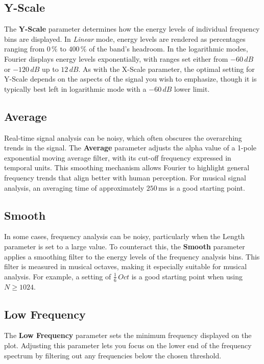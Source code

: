\documentclass[12pt,letter]{article}
\begin{document}
\subsection{Y-Scale}

The \textbf{Y-Scale} parameter determines how the energy levels of individual
frequency bins are displayed. In \textit{Linear} mode, energy levels are
rendered as percentages ranging from $0\,\%$ to $400\,\%$ of the band's
headroom. In the logarithmic modes, Fourier displays energy levels
exponentially, with ranges set either from $-60\,dB$ or $-120\,dB$ up to
$12\,dB$. As with the X-Scale parameter, the optimal setting for Y-Scale
depends on the aspects of the signal you wish to emphasize, though it is
typically best left in logarithmic mode with a $-60\,dB$ lower limit.

\subsection{Average}

Real-time signal analysis can be noisy, which often obscures the overarching
trends in the signal. The \textbf{Average} parameter adjusts the alpha value
of a 1-pole exponential moving average filter, with its cut-off frequency
expressed in temporal units. This smoothing mechanism allows Fourier to
highlight general frequency trends that align better with human perception.
For musical signal analysis, an averaging time of approximately
$250\,\mathrm{ms}$ is a good starting point.

\subsection{Smooth}

In some cases, frequency analysis can be noisy, particularly when the Length
parameter is set to a large value. To counteract this, the \textbf{Smooth}
parameter applies a smoothing filter to the energy levels of the frequency
analysis bins. This filter is measured in musical octaves, making it
especially suitable for musical analysis. For example, a setting of
$\frac{1}{6}\,Oct$ is a good starting point when using $N \geq 1024$.

\subsection{Low Frequency}

The \textbf{Low Frequency} parameter sets the minimum frequency displayed on
the plot. Adjusting this parameter lets you focus on the lower end of the
frequency spectrum by filtering out any frequencies below the chosen
threshold.
\end{document}
